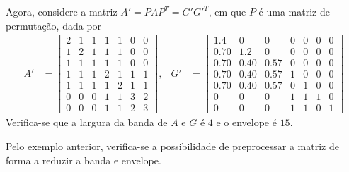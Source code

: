\begin{exem}
    Agora, considere a matriz $A' = P A P^T = G' G'^T$, em que $P$ é uma matriz de
    permutação, dada por
    \begin{align*}
        A' &= \begin{bmatrix}
            2 & 1 & 1 & 1 & 1 & 0 & 0 \\
            1 & 2 & 1 & 1 & 1 & 0 & 0 \\
            1 & 1 & 1 & 1 & 1 & 0 & 0 \\
            1 & 1 & 1 & 2 & 1 & 1 & 1 \\
            1 & 1 & 1 & 1 & 2 & 1 & 1 \\
            0 & 0 & 0 & 1 & 1 & 3 & 2 \\
            0 & 0 & 0 & 1 & 1 & 2 & 3
        \end{bmatrix},
        & G' &= \begin{bmatrix}
             1.4 & 0 & 0 & 0 & 0 & 0 & 0 \\
            0.70 & 1.2 & 0 & 0 & 0 & 0 & 0 \\
            0.70 & 0.40 & 0.57 & 0 & 0 & 0 & 0 \\
            0.70 & 0.40 & 0.57 & 1 & 0 & 0 & 0 \\
            0.70 & 0.40 & 0.57 & 0 & 1 & 0 & 0 \\
            0 & 0 & 0 & 1 & 1 & 1 & 0 \\
            0 & 0 & 0 & 1 & 1 & 0 & 1
        \end{bmatrix}
    \end{align*}
    Verifica-se que a largura da banda de $A$ e $G$ é $4$ e o envelope é $15$.
\end{exem}

Pelo exemplo anterior, verifica-se a possibilidade de preprocessar a matriz
de forma a reduzir a banda e envelope.

% 
% 

